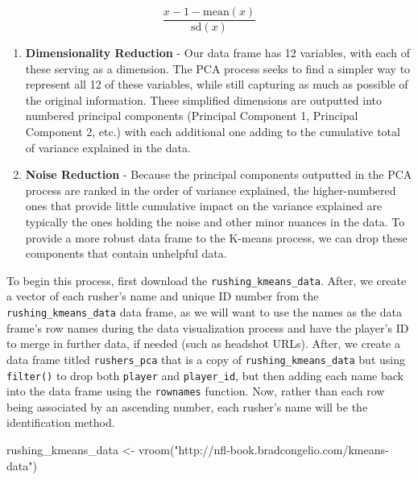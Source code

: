 \documentclass[
  letterpaper,
]{krantz}
\newenvironment{Shaded}{\begin{snugshade}}{\end{snugshade}}
\newcommand{\FunctionTok}[1]{\textcolor[rgb]{0.28,0.35,0.67}{#1}}
\newcommand{\NormalTok}[1]{\textcolor[rgb]{0.00,0.23,0.31}{#1}}
\newcommand{\OtherTok}[1]{\textcolor[rgb]{0.00,0.23,0.31}{#1}}
\newcommand{\StringTok}[1]{\textcolor[rgb]{0.13,0.47,0.30}{#1}}
\providecommand{\tightlist}{%
  \setlength{\itemsep}{0pt}\setlength{\parskip}{0pt}}\usepackage{longtable,booktabs,array}
\begin{document}
\[
\frac{x-1 - \text{mean}(x)}{\text{sd}(x)}
\]

\begin{enumerate}
\def\labelenumi{\arabic{enumi}.}
\setcounter{enumi}{1}
\tightlist
\item
  \textbf{Dimensionality Reduction} - Our data frame has 12 variables,
  with each of these serving as a dimension. The PCA process seeks to
  find a simpler way to represent all 12 of these variables, while still
  capturing as much as possible of the original information. These
  simplified dimensions are outputted into numbered principal components
  (Principal Component 1, Principal Component 2, etc.) with each
  additional one adding to the cumulative total of variance explained in
  the data.
\item
  \textbf{Noise Reduction} - Because the principal components outputted
  in the PCA process are ranked in the order of variance explained, the
  higher-numbered ones that provide little cumulative impact on the
  variance explained are typically the ones holding the noise and other
  minor nuances in the data. To provide a more robust data frame to the
  K-means process, we can drop these components that contain unhelpful
  data.
\end{enumerate}

To begin this process, first download the
\texttt{rushing\_kmeans\_data}. After, we create a vector of each
rusher's name and unique ID number from the
\texttt{rushing\_kmeans\_data} data frame, as we will want to use the
names as the data frame's row names during the data visualization
process and have the player's ID to merge in further data, if needed
(such as headshot URLs). After, we create a data frame titled
\texttt{rushers\_pca} that is a copy of \texttt{rushing\_kmeans\_data}
but using \texttt{filter()} to drop both \texttt{player} and
\texttt{player\_id}, but then adding each name back into the data frame
using the \texttt{rownames} function. Now, rather than each row being
associated by an ascending number, each rusher's name will be the
identification method.

\begin{Shaded}
\begin{Highlighting}[]
\NormalTok{rushing\_kmeans\_data }\OtherTok{\textless{}{-}} \FunctionTok{vroom}\NormalTok{(}\StringTok{"http://nfl{-}book.bradcongelio.com/kmeans{-}data"}\NormalTok{)}
\end{Highlighting}
\end{Shaded}
\end{document}
